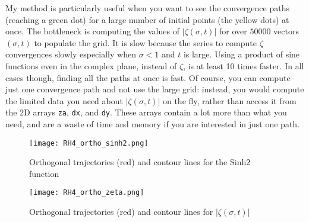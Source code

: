\documentclass[oneside,10pt]{book}
\begin{document}
My method is particularly useful when you want to see the convergence paths (reaching a green dot) for a large number of initial points (the yellow dots) at once. The bottleneck is computing the values of $|\zeta(\sigma,t)|$ for over $\num{50000}$ vectors $(\sigma, t)$ to 
 populate the grid. It is slow because the series to compute $\zeta$ convergences slowly especially when $\sigma<1$ and $t$ is large. Using a product of sine functions even in the complex plane, instead of $\zeta$, is at least 10 times faster. In all cases though, finding all the paths at once is fast.
 Of course, you can compute just one convergence path and not use the large grid: instead, you would compute the limited data you need about $|\zeta(\sigma,t)|$  on the fly, rather than access it from the 2D arrays \texttt{za}, \texttt{dx}, and \texttt{dy}. These arrays contain a lot more than what you need, and are a waste of time and memory if you are interested in just one path.

\begin{figure}%
\centering
\texttt{[image: RH4\_ortho\_sinh2.png]}
\caption{Orthogonal trajectories (red) and contour lines for the Sinh2 function}
\label{fig:ortho1}
\end{figure}


\begin{figure}%
\centering
\texttt{[image: RH4\_ortho\_zeta.png]}
\caption{Orthogonal trajectories (red) and contour lines for $|\zeta(\sigma,t)|$}
\label{fig:ortho2}
\end{figure}

\end{document}
